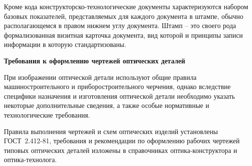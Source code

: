 Кроме кода конструкторско-технологические документы характеризуются набором базовых показателей, представляемых для каждого документа в штампе, обычно располагающемся в правом нижнем углу документа. Штамп -- это своего рода формализованная визитная карточка документа, вид которой и принципы записи информации в которую стандартизованы.

\begin{flushleft}
	\textbf{Требования к оформлению чертежей оптических деталей}
\end{flushleft}

При изображении оптической детали используют общие правила машиностроительного и приборостроительного черчения, однако вследствие специфики назначения и изготовления оптической детали необходимо указать некоторые дополнительные сведения, а также особые нормативные и технологические требования.

Правила выполнения чертежей и схем оптических изделий установлены ГОСТ~2.412-81, требования и рекомендации по оформлению рабочих чертежей типовых оптических деталей изложены в справочниках оптика-конструктора и оптика-технолога.

